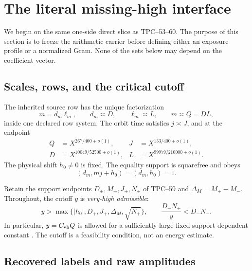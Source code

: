 \section{The literal missing-high interface}
\label{sec:tpc61-physical-interface}

We begin on the same one-side direct slice as TPC--53--60.  The purpose of
this section is to freeze the arithmetic carrier before defining either an
exposure profile or a normalized Gram.  None of the sets below may depend on
the coefficient vector.

\subsection{Scales, rows, and the critical cutoff}

The inherited source row has the unique factorization
\begin{equation}
 m=d_m\ell_m,
 \qquad d_m\asymp D,
 \qquad \ell_m\asymp L,
 \qquad m\asymp Q=DL,
 \label{eq:tpc61-source-scales}
\end{equation}
inside one declared row system.  The orbit time satisfies \(j\asymp J\),
and at the endpoint
\begin{equation}
 \begin{aligned}
 Q&=X^{267/400+o(1)},
 &J&=X^{133/400+o(1)},\\
 D&=X^{10049/52500+o(1)},
 &L&=X^{99979/210000+o(1)}.
 \end{aligned}
 \label{eq:tpc61-endpoint-scales}
\end{equation}
The physical shift \(h_0\ne0\) is fixed.  The equality support is
squarefree and obeys
\begin{equation}
 (d_m,mj+h_0)=(d_m,h_0)=1.
 \label{eq:tpc61-source-coprimality}
\end{equation}

Retain the support endpoints \(D_\pm,M_\pm,J_\pm,N_\pm\) of TPC--59 and
\(\Delta_M=M_+-M_-\).  Throughout, the cutoff \(y\) is
\emph{very-high admissible}:
\begin{equation}
 y>\max\{|h_0|,D_+,J_+,\Delta_M,\sqrt{N_+}\},
 \qquad
 \frac{D_+N_+}{y}<D_-N_-.
 \label{eq:tpc61-very-high-admissible}
\end{equation}
In particular, \(y=C_{\rm vh}Q\) is allowed for a sufficiently large fixed
support-dependent constant \citep{WangTPC59}.  The cutoff is a feasibility
condition, not an energy estimate.

\subsection{Recovered labels and raw amplitudes}

